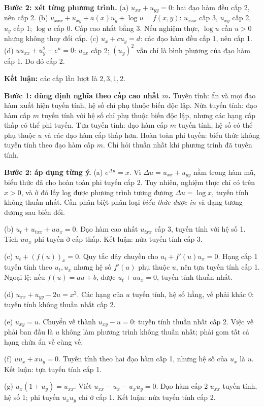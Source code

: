 \textbf{Bước 2: xét từng phương trình.}
(a) $u_{xx}+u_{yy}=0$: hai đạo hàm đều cấp 2, nên cấp 2.
(b) $u_{xxx}+u_{xy}+a(x)u_y+\log u=f(x,y)$: $u_{xxx}$ cấp 3, $u_{xy}$ cấp 2, $u_y$ cấp 1; $\log u$ cấp 0. Cấp cao nhất bằng 3. Nếu nghiệm thực, $\log u$ cần $u>0$ nhưng không thay đổi cấp.
(c) $u_x+cu_y=d$: các đạo hàm đều cấp 1, nên cấp 1.
(d) $uu_{xx}+u_y^2+e^u=0$: $u_{xx}$ cấp 2; $(u_y)^2$ vẫn chỉ là bình phương của đạo hàm cấp 1. Do đó cấp 2.

\textbf{Kết luận:} các cấp lần lượt là $\boxed{2,3,1,2}$.

\textbf{Bước 1: dùng định nghĩa theo cấp cao nhất $m$.} Tuyến tính: ẩn và mọi đạo hàm xuất hiện tuyến tính, hệ số chỉ phụ thuộc biến độc lập. Nửa tuyến tính: đạo hàm cấp $m$ tuyến tính với hệ số chỉ phụ thuộc biến độc lập, nhưng các hạng cấp thấp có thể phi tuyến. Tựa tuyến tính: đạo hàm cấp $m$ tuyến tính, hệ số có thể phụ thuộc $u$ và các đạo hàm cấp thấp hơn. Hoàn toàn phi tuyến: biểu thức không tuyến tính theo đạo hàm cấp $m$. Chỉ hỏi thuần nhất khi phương trình đã tuyến tính.

\textbf{Bước 2: áp dụng từng ý.}
(a) $e^{\Delta u}=x$. Vì $\Delta u=u_{xx}+u_{yy}$ nằm trong hàm mũ, biểu thức đã cho hoàn toàn phi tuyến cấp 2. Tuy nhiên, nghiệm thực chỉ có trên $x>0$, và ở đó lấy log được phương trình tương đương $\Delta u=\log x$, tuyến tính không thuần nhất. Cần phân biệt phân loại \emph{biểu thức được in} và dạng tương đương sau biến đổi.

(b) $u_t+u_{txx}+uu_x=0$. Đạo hàm cao nhất $u_{txx}$ cấp 3, tuyến tính với hệ số 1. Tích $uu_x$ phi tuyến ở cấp thấp. Kết luận: nửa tuyến tính cấp 3.

(c) $u_t+(f(u))_x=0$. Quy tắc dây chuyền cho $u_t+f'(u)u_x=0$. Hạng cấp 1 tuyến tính theo $u_t,u_x$ nhưng hệ số $f'(u)$ phụ thuộc $u$, nên tựa tuyến tính cấp 1. Ngoại lệ: nếu $f(u)=au+b$, được $u_t+au_x=0$, tuyến tính thuần nhất.

(d) $u_{xx}+u_{yy}-2u=x^2$. Các hạng của $u$ tuyến tính, hệ số hằng, vế phải khác 0: tuyến tính không thuần nhất cấp 2.

(e) $u_{xy}=u$. Chuyển vế thành $u_{xy}-u=0$: tuyến tính thuần nhất cấp 2. Việc vế phải ban đầu là $u$ không làm phương trình không thuần nhất; phải gom tất cả hạng chứa ẩn về cùng vế.

(f) $uu_x+xu_y=0$. Tuyến tính theo hai đạo hàm cấp 1, nhưng hệ số của $u_x$ là $u$. Kết luận: tựa tuyến tính cấp 1.

(g) $u_x(1+u_y)=u_{xx}$. Viết $u_{xx}-u_x-u_xu_y=0$. Đạo hàm cấp 2 $u_{xx}$ tuyến tính, hệ số 1; phi tuyến $u_xu_y$ chỉ ở cấp 1. Kết luận: nửa tuyến tính cấp 2.

